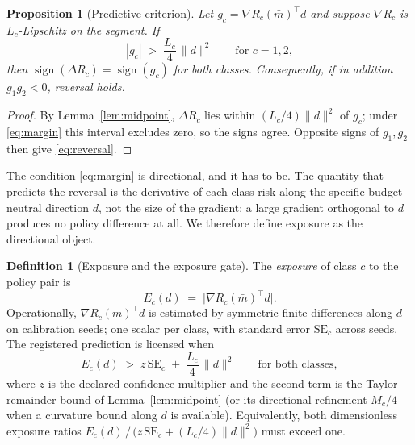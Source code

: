 \documentclass[11pt]{article}
\newtheorem{proposition}{Proposition}
\theoremstyle{definition}
\newtheorem{definition}{Definition}
\theoremstyle{remark}
\newcommand{\mbar}{\bar{m}}
\begin{document}
\begin{proposition}[Predictive criterion]\label{prop:midpoint}
Let $g_c = \nabla R_c(\mbar)^{\top} d$ and suppose $\nabla R_c$ is
$L_c$-Lipschitz on the segment. If
\begin{equation}\label{eq:margin}
|g_c| \;>\; \frac{L_c}{4}\,\|d\|^2
\qquad\text{for } c = 1,2,
\end{equation}
then $\operatorname{sign}(\Delta R_c) = \operatorname{sign}(g_c)$ for both
classes. Consequently, if in addition $g_1 g_2 < 0$, reversal holds.
\end{proposition}

\begin{proof}
By Lemma~\ref{lem:midpoint}, $\Delta R_c$ lies within $(L_c/4)\|d\|^2$ of
$g_c$; under \eqref{eq:margin} this interval excludes zero, so the signs
agree. Opposite signs of $g_1, g_2$ then give \eqref{eq:reversal}.
\end{proof}

The condition \eqref{eq:margin} is directional, and it has to be. The
quantity that predicts the reversal is the derivative of each class risk
along the specific budget-neutral direction $d$, not the size of the
gradient: a large gradient orthogonal to $d$ produces no policy difference
at all. We therefore define exposure as the directional object.

\begin{definition}[Exposure and the exposure gate]\label{def:gate}
The \emph{exposure} of class $c$ to the policy pair is
\begin{equation}\label{eq:exposure}
E_c(d) \;=\; \bigl|\nabla R_c(\mbar)^{\top} d\bigr| .
\end{equation}
Operationally, $\nabla R_c(\mbar)^{\top} d$ is estimated by symmetric finite
differences along $d$ on calibration seeds; one scalar per class, with
standard error $\mathrm{SE}_c$ across seeds. The registered prediction is
licensed when
\begin{equation}\label{eq:gate}
E_c(d) \;>\; z\,\mathrm{SE}_c \;+\; \frac{L_c}{4}\,\|d\|^2
\qquad\text{for both classes},
\end{equation}
where $z$ is the declared confidence multiplier and the second term is the
Taylor-remainder bound of Lemma~\ref{lem:midpoint} (or its directional
refinement $M_c/4$ when a curvature bound along $d$ is available).
Equivalently, both dimensionless exposure ratios
$E_c(d)\,/\,\bigl(z\,\mathrm{SE}_c + (L_c/4)\|d\|^2\bigr)$ must exceed one.
\end{definition}
\end{document}
